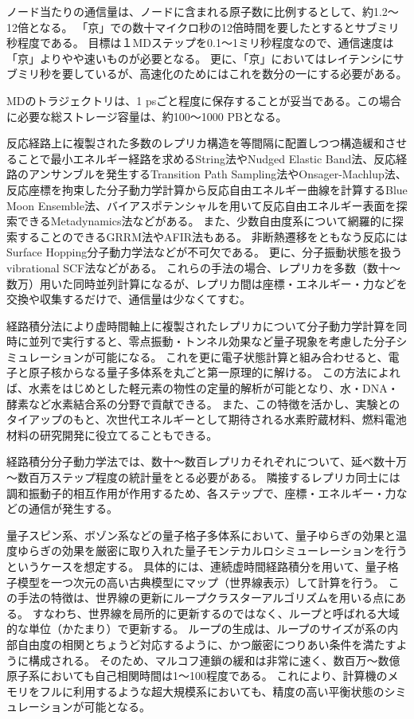 ノード当たりの通信量は、ノードに含まれる原子数に比例するとして、約1.2～12倍となる。
「京」での数十マイクロ秒の12倍時間を要したとするとサブミリ秒程度である。
目標は１MDステップを0.1～1ミリ秒程度なので、通信速度は「京」よりやや速いものが必要となる。
更に、「京」においてはレイテンシにサブミリ秒を要しているが、高速化のためにはこれを数分の一にする必要がある。

MDのトラジェクトリは、1 psごと程度に保存することが妥当である。この場合に必要な総ストレージ容量は、約100～1000 PBとなる。


\label{sec:4-2_要求性能_化学反応動力学}
反応経路上に複製された多数のレプリカ構造を等間隔に配置しつつ構造緩和させることで最小エネルギー経路を求めるString法やNudged Elastic Band法、反応経路のアンサンブルを発生するTransition Path Sampling法やOnsager-Machlup法、反応座標を拘束した分子動力学計算から反応自由エネルギー曲線を計算するBlue Moon Ensemble法、バイアスポテンシャルを用いて反応自由エネルギー表面を探索できるMetadynamics法などがある。
また、少数自由度系について網羅的に探索することのできるGRRM法やAFIR法もある。
非断熱遷移をともなう反応にはSurface Hopping分子動力学法などが不可欠である。
更に、分子振動状態を扱うvibrational SCF法などがある。
これらの手法の場合、レプリカを多数（数十～数万）用いた同時並列計算になるが、レプリカ間は座標・エネルギー・力などを交換や収集するだけで、通信量は少なくてすむ。


\label{sec:4-2_要求性能_量子MD}
経路積分法により虚時間軸上に複製されたレプリカについて分子動力学計算を同時に並列で実行すると、零点振動・トンネル効果など量子現象を考慮した分子シミュレーションが可能になる。
これを更に電子状態計算と組み合わせると、電子と原子核からなる量子多体系を丸ごと第一原理的に解ける。
この方法によれば、水素をはじめとした軽元素の物性の定量的解析が可能となり、水・DNA・酵素など水素結合系の分野で貢献できる。
また、この特徴を活かし、実験とのタイアップのもと、次世代エネルギーとして期待される水素貯蔵材料、燃料電池材料の研究開発に役立てることもできる。

経路積分分子動力学法では、数十～数百レプリカそれぞれについて、延べ数十万～数百万ステップ程度の統計量をとる必要がある。
隣接するレプリカ同士には調和振動子的相互作用が作用するため、各ステップで、座標・エネルギー・力などの通信が発生する。


\label{sec:4-2_要求性能_クラスター量子MC}
量子スピン系、ボゾン系などの量子格子多体系において、量子ゆらぎの効果と温度ゆらぎの効果を厳密に取り入れた量子モンテカルロシミューレーションを行うというケースを想定する。
具体的には、連続虚時間経路積分を用いて、量子格子模型を一つ次元の高い古典模型にマップ（世界線表示）して計算を行う。
この手法の特徴は、世界線の更新にループクラスターアルゴリズムを用いる点にある。
すなわち、世界線を局所的に更新するのではなく、ループと呼ばれる大域的な単位（かたまり）で更新する。
ループの生成は、ループのサイズが系の内部自由度の相関とちょうど対応するように、かつ厳密につりあい条件を満たすように構成される。
そのため、マルコフ連鎖の緩和は非常に速く、数百万～数億原子系においても自己相関時間は1～100程度である。
これにより、計算機のメモリをフルに利用するような超大規模系においても、精度の高い平衡状態のシミュレーションが可能となる。

